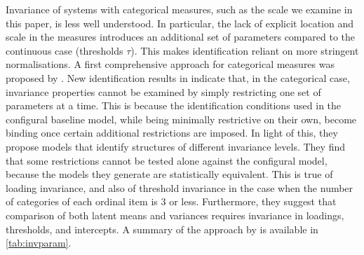 Invariance of systems with categorical measures, such as the scale we examine in this paper, is less well understood. In particular, the lack of explicit location and scale in the measures introduces an additional set of parameters compared to the continuous case (thresholds $\tau$). This makes identification reliant on more stringent normalisations. A first comprehensive approach for categorical measures was proposed by \cite{Millsap2004}. New identification results in \cite{Wu2016a} indicate that, in the categorical case, invariance properties cannot be examined by simply restricting one set of parameters at a time. This is because the identification conditions used in the configural baseline model, while being minimally restrictive on their own, become binding once certain additional restrictions are imposed. In light of this, they propose models that identify structures of different invariance levels. They find that some restrictions cannot be tested alone against the configural model, because the models they generate are statistically equivalent. This is true of loading invariance, and also of threshold invariance in the case when the number of categories of each ordinal item is 3 or less. Furthermore, they suggest that comparison of both latent means and variances requires invariance in loadings, thresholds, and intercepts. A summary of the approach by \cite{Wu2016a} is available in \autoref{tab:invparam}.



